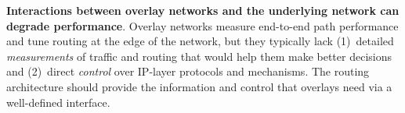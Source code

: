 %

{\bf Interactions between overlay networks and the underlying
network can degrade performance}.  
Overlay networks measure end-to-end path performance and tune routing
at the edge of the network, but they typically lack (1)~detailed {\em
measurements\/} of traffic and routing that would help them make
better decisions and (2)~direct {\em control\/} over IP-layer
protocols and mechanisms. The routing architecture should provide the
information and control that overlays need via a well-defined
interface. 
%

